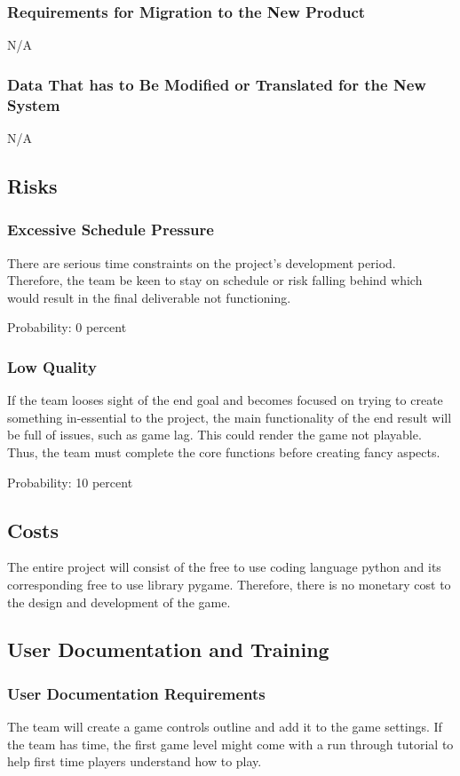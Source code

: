 \documentclass[12pt, titlepage]{article}
\begin{document}
\subsubsection{Requirements for Migration to the New Product}
N/A

\subsubsection{Data That has to Be Modified or Translated for the New System}
N/A

\subsection{Risks}
\subsubsection{Excessive Schedule Pressure}
There are serious time constraints on the project's development period. Therefore, the team be keen to stay on schedule or risk falling behind which would result in the final deliverable not functioning.

Probability: 0 percent

\subsubsection{Low Quality}
If the team looses sight of the end goal and becomes focused on trying to create something in-essential to the project, the main functionality of the end result will be full of issues, such as game lag. This could render the game not playable. Thus, the team must complete the core functions before creating fancy aspects.

Probability: 10 percent

\subsection{Costs}
The entire project will consist of the free to use coding language python and its corresponding free to use library pygame. Therefore, there is no monetary cost to the design and development of the game.

\subsection{User Documentation and Training}
\subsubsection{User Documentation Requirements}
The team will create a game controls outline and add it to the game settings. If the team has time, the first game level might come with a run through tutorial to help first time players understand how to play.
\end{document}
